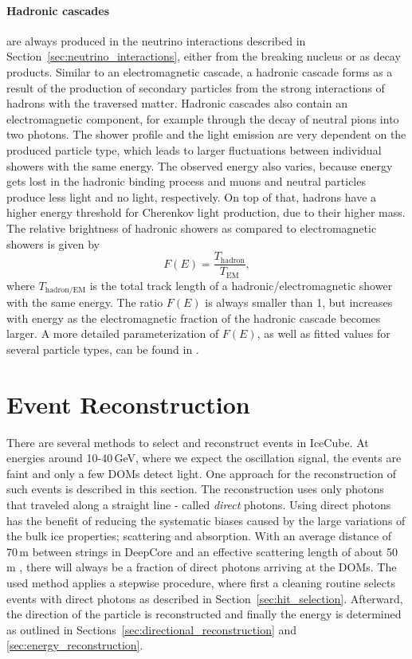 \paragraph{Hadronic cascades} are always produced in the neutrino interactions described in Section~\ref{sec:neutrino_interactions}, either from the breaking nucleus or as decay products.
Similar to an electromagnetic cascade, a hadronic cascade forms as a result of the production of secondary particles from the strong interactions of hadrons with the traversed matter.
Hadronic cascades also contain an electromagnetic component, for example through the decay of neutral pions into two photons. 
The shower profile and the light emission are very dependent on the produced particle type, which leads to larger fluctuations between individual showers with the same energy.
The observed energy also varies, because energy gets lost in the hadronic binding process and muons and neutral particles produce less light and no light, respectively.
On top of that, hadrons have a higher energy threshold for Cherenkov light production, due to their higher mass.
The relative brightness of hadronic showers as compared to electromagnetic showers is given by \cite{LRaedel}
\begin{equation}
    F(E) = \frac{T_\mathrm{hadron}}{T_\mathrm{EM}},%
    \label{eq:relative_shower_brighness}
\end{equation}
where $T_\mathrm{hadron/EM}$ is the total track length of a hadronic/electromagnetic shower with the same energy.
The ratio $F(E)$ is always smaller than 1, but increases with energy as the electromagnetic fraction of the hadronic cascade becomes larger.
A more detailed parameterization of $F(E)$, as well as fitted values for several particle types, can be found in \cite{LRaedel}.
   

\section{Event Reconstruction} \label{sec:event_reconstruction}

There are several methods to select and reconstruct events in IceCube.
At energies around 10-40\,GeV, where we expect the oscillation signal, the events are faint and only a few DOMs detect light.
One approach for the reconstruction of such events is described in this section.
The reconstruction uses only photons that traveled along a straight line - called \textit{direct} photons.
Using direct photons has the benefit of reducing the systematic biases caused by the large variations of the bulk ice properties; scattering and absorption.
With an average distance of 70\,m between strings in DeepCore and an effective scattering length of about 50\,m \cite{LUNDBERG2007619}, there will always be a fraction of direct photons arriving at the DOMs.
The used method applies a stepwise procedure, where first a cleaning routine selects events with direct photons as described in Section~\ref{sec:hit_selection}. 
Afterward, the direction of the particle is reconstructed and finally the energy is determined as outlined in Sections~\ref{sec:directional_reconstruction} and \ref{sec:energy_reconstruction}.


